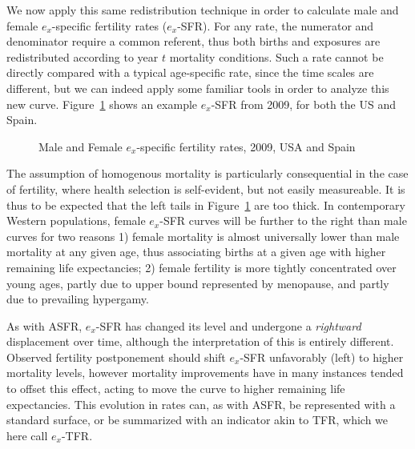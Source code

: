 We now apply this same redistribution technique in order to
calculate male and female $e_x$-specific fertility rates ($e_x$-SFR). For any
rate, the numerator and denominator require a common referent, thus both births and
exposures are redistributed according to year $t$ mortality conditions. Such a
rate cannot be directly compared with a typical age-specific rate, since the
time scales are different, but we can indeed apply some familiar tools in order
to analyze this new curve. Figure~\ref{fig:eSFR2009} shows an example $e_x$-SFR
from 2009, for both the US and Spain.

\begin{figure}[ht!]
        \centering  
          \caption{Male and Female $e_x$-specific fertility rates, 2009, USA and
          Spain}
          \label{fig:eSFR2009}
\end{figure}

The assumption of homogenous mortality is particularly consequential in the case
of fertility, where health selection is self-evident, but not easily measureable.
It is thus to be expected that the left tails in Figure~\ref{fig:eSFR2009} are
too thick. In contemporary Western populations, female $e_x$-SFR curves will be
further to the right than male curves for two reasons 1) female mortality is
almost universally lower than male mortality at any given age, thus associating
births at a given age with higher remaining life expectancies; 2)
female fertility is more tightly concentrated over young ages, partly due to
upper bound represented by menopause, and partly due to prevailing hypergamy. 

As with ASFR, $e_x$-SFR has changed its level and undergone a \textit{rightward}
displacement over time, although the interpretation of this is entirely
different. Observed fertility postponement should shift $e_x$-SFR unfavorably
(left) to higher mortality levels, however mortality improvements have in many
instances tended to offset this effect, acting to move the curve to higher
remaining life expectancies. This evolution in rates can, as with ASFR, be
represented with a standard surface, or be summarized with an indicator akin to
TFR, which we here call $e_x$-TFR.










